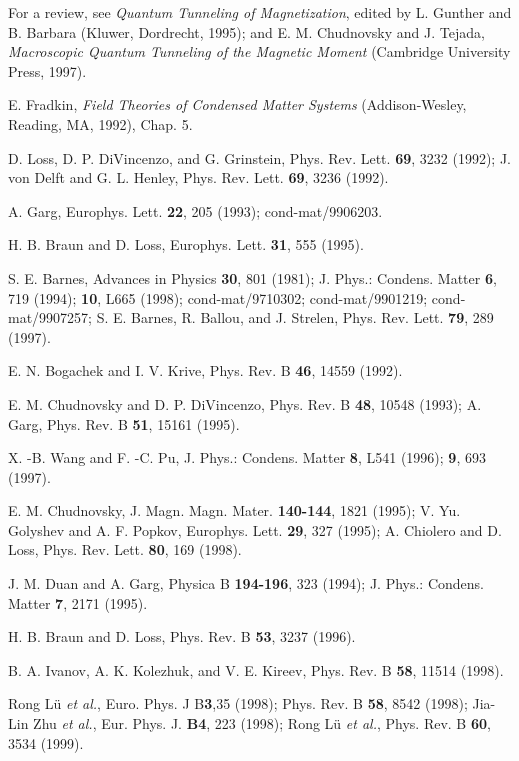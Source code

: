 \begin{references}
  For a review, see {\it Quantum Tunneling of Magnetization},
edited by L. Gunther and B. Barbara (Kluwer, Dordrecht, 1995); and E. M.
Chudnovsky and J. Tejada, {\it Macroscopic Quantum Tunneling of the Magnetic
Moment} (Cambridge University Press, 1997).

  E. Fradkin, {\it Field Theories of Condensed Matter Systems}
(Addison-Wesley, Reading, MA, 1992), Chap. 5.

  D. Loss, D. P. DiVincenzo, and G. Grinstein, Phys. Rev. Lett. 
{\bf 69}, 3232 (1992); J. von Delft and G. L. Henley, Phys. Rev. Lett. {\bf %
69}, 3236 (1992).

  A. Garg, Europhys. Lett. {\bf 22}, 205 (1993); cond-mat/9906203.

  H. B. Braun and D. Loss, Europhys. Lett. {\bf 31}, 555 (1995).

  S. E. Barnes, Advances in Physics {\bf 30}, 801 (1981); J.
Phys.: Condens. Matter {\bf 6}, 719 (1994); {\bf 10}, L665 (1998);
cond-mat/9710302; cond-mat/9901219; cond-mat/9907257; S. E. Barnes, R.
Ballou, and J. Strelen, Phys. Rev. Lett. {\bf 79}, 289 (1997).

  E. N. Bogachek and I. V. Krive, Phys. Rev. B {\bf 46}, 14559
(1992).

  E. M. Chudnovsky and D. P. DiVincenzo, Phys. Rev. B {\bf 48},
10548 (1993); A. Garg, Phys. Rev. B {\bf 51}, 15161 (1995).

  X. -B. Wang and F. -C. Pu, J. Phys.: Condens. Matter {\bf 8},
L541 (1996); {\bf 9}, 693 (1997).

  E. M. Chudnovsky, J. Magn. Magn. Mater. {\bf 140-144}, 1821
(1995); V. Yu. Golyshev and A. F. Popkov, Europhys. Lett. {\bf 29}, 327
(1995); A. Chiolero and D. Loss, Phys. Rev. Lett. {\bf 80}, 169 (1998).

  J. M. Duan and A. Garg, Physica B {\bf 194-196}, 323 (1994);
J. Phys.: Condens. Matter {\bf 7}, 2171 (1995).

  H. B. Braun and D. Loss, Phys. Rev. B {\bf 53}, 3237 (1996).

  B. A. Ivanov, A. K. Kolezhuk, and V. E. Kireev, Phys. Rev. B 
{\bf 58}, 11514 (1998).

  Rong L\"{u} {\it et al.}, Euro. Phys. J B{\bf 3},35 (1998);
Phys. Rev. B {\bf 58}, 8542 (1998); Jia-Lin Zhu {\it et al.}, Eur. Phys. J. 
{\bf B4}, 223 (1998); Rong L\"{u} {\it et al.}, Phys. Rev. B {\bf 60}, 3534
(1999).


\end{references}
